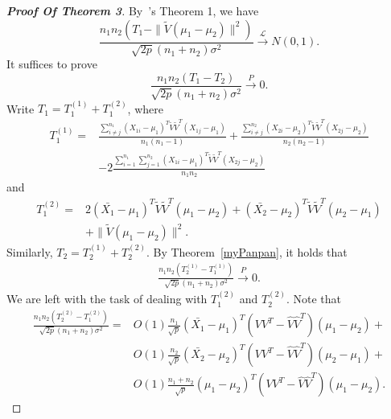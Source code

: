 \begin{proof}[\textbf{Proof Of Theorem 3}]
    By~\cite{Chen2010A}'s Theorem 1, we have
    \begin{equation*}
        \frac{n_1 n_2 (T_1-\|\tilde{V}(\mu_1-\mu_2)\|^2)}{\sqrt{2p}(n_1+n_2)\sigma^2}\xrightarrow{\mathcal{L}}N(0,1).
    \end{equation*}
    It suffices to prove
\begin{equation*}
\frac{n_1n_2(T_1-T_2)}{\sqrt{2p}(n_1+n_2)\sigma^2}\xrightarrow{P}0.
\end{equation*}
Write $T_1=T_1^{(1)}+T_1^{(2)}$, where
\begin{equation*}
\begin{aligned}
    T_1^{(1)}=&\frac{\sum_{i\neq j}^{n_1}{(X_{1i}-\mu_1)}^T\tilde{V}\tilde{V}^T(X_{1j}-\mu_1)}{n_1(n_1-1)}+\frac{\sum_{i\neq j}^{n_2}{(X_{2i}-\mu_2)}^T\tilde{V}\tilde{V}^T(X_{2j}-\mu_2)}{n_2(n_2-1)}
\\
    &-2\frac{\sum_{i=1}^{n_1}\sum_{j=1}^{n_2}{(X_{1i}-\mu_1)}^T\tilde{V}\tilde{V}^T(X_{2j}-\mu_2)}{n_1n_2}
\end{aligned}
\end{equation*}
and
\begin{equation*}
\begin{aligned}
    T_1^{(2)}=&2{(\bar{X_{1}}-\mu_1)}^T\tilde{V}\tilde{V}^T(\mu_1-\mu_2)+{(\bar{X_{2}}-\mu_2)}^T\tilde{V}\tilde{V}^T(\mu_2-\mu_1)
\\
&+\|\tilde{V}(\mu_1-\mu_2)\|^2.
\end{aligned}
\end{equation*}
    Similarly, $T_2=T_2^{(1)}+T_2^{(2)}$. By Theorem~\ref{myPanpan}, it holds that
    \begin{equation}\label{yintianHaha}
        \begin{aligned}
            \frac{n_1n_2(T_2^{(1)}-T_1^{(1)})}{\sqrt{2p}(n_1+n_2)\sigma^2}\xrightarrow{P}0.
        \end{aligned}
    \end{equation}
We are left with the task of dealing with $T_{1}^{(2)}$ and $T_{2}^{(2)}$. Note that
\begin{align}
    \frac{n_1n_2(T_2^{(2)}-T_1^{(2)})}{\sqrt{2p}(n_1+n_2)\sigma^2}=&O(1)\frac{n_1}{\sqrt{p}}{(\bar{X_{1}}-\mu_1)}^T(VV^T -\hat{V}\hat{V}^T)(\mu_1-\mu_2)+
\label{yumenHaha1}\\
    &O(1)\frac{n_2}{\sqrt{p}}{(\bar{X_{2}}-\mu_2)}^T(VV^T-\hat{V}\hat{V}^T)(\mu_2-\mu_1)+
\label{yumenHaha2}\\
    &O(1)\frac{n_1+n_2}{\sqrt{p}}{(\mu_1-\mu_2)}^T(VV^T-\hat{V}\hat{V}^T)(\mu_1-\mu_2).
\label{yumenHaha3}
\end{align}


\end{proof}
